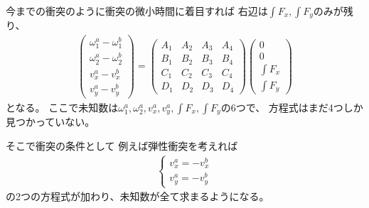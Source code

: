 \documentclass[a4paper,11pt]{jsarticle}
\begin{document}
今までの衝突のように衝突の微小時間に着目すれば
右辺は$\int F_x, \int F_y$のみが残り、
\begin{align*}
  \begin{pmatrix}
    \omega_1^a - \omega_1^b
    \\
    \omega_2^a - \omega_2^b
    \\
    v_x^a - v_x^b
    \\
    v_y^a - v_y^b
  \end{pmatrix}
  =
  \begin{pmatrix}
    A_1 & A_2 & A_3 & A_4
    \\
    B_1 & B_2 & B_3 & B_4
    \\
    C_1 & C_2 & C_3 & C_4
    \\
    D_1 & D_2 & D_3 & D_4
  \end{pmatrix}
  \begin{pmatrix}
    0
    \\
    0
    \\
    \int F_x
    \\
    \int F_y
  \end{pmatrix}
\end{align*}
となる。
ここで未知数は$\omega_1^a, \omega_2^a, v_x^a, v_y^a, \int F_x, \int F_y$の6つで、
方程式はまだ4つしか見つかっていない。

そこで衝突の条件として
例えば弾性衝突を考えれば
\begin{align*}
  \begin{cases}
    v_x^a = -v_x^b
    \\
    v_y^a = -v_y^b
  \end{cases}
\end{align*}
の2つの方程式が加わり、未知数が全て求まるようになる。
\end{document}
